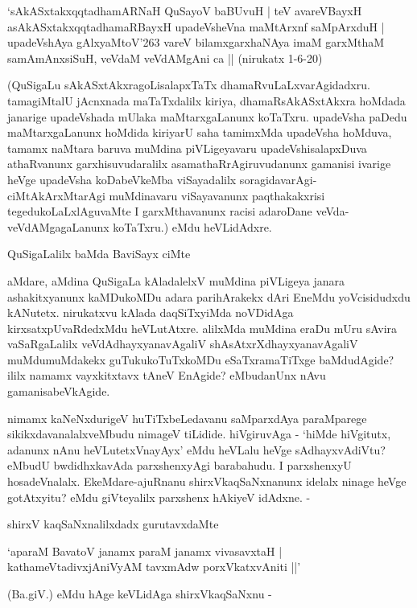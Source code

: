 \begin{shloka}
`sAkASxtakxqqtadhamARNaH QuSayoV baBUvuH | teV avareVBayxH\\
asAkASxtakxqqtadhamaRBayxH upadeVsheVna maMtArxnf saMpArxduH |\\
upadeVshAya gAlxyaMtoV\char'263 vareV bilamxgarxhaNAya imaM garxMthaM\\
samAmAnxsiSuH, veVdaM veVdAMgAni ca || (nirukatx 1-6-20)
\end{shloka}

(QuSigaLu sAkASxtAkxragoLisalapxTaTx dhamaRvuLaLxvarAgidadxru. tamagiMtalU jAcnxnada maTaTxdalilx kiriya, dhamaRsAkASxtAkxra hoMdada janarige upadeVshada mUlaka maMtarxgaLanunx koTaTxru. upadeVsha paDedu maMtarxgaLanunx hoMdida kiriyarU saha tamimxMda upadeVsha hoMduva, tamamx naMtara baruva muMdina piVLigeyavaru upadeVshisalapxDuva athaRvanunx garxhisuvudaralilx asamathaRrAgiruvudanunx gamanisi ivarige heVge upadeVsha koDabeVkeMba viSayadalilx soragidavarAgi-ciMtAkArxMtarAgi muMdinavaru viSayavanunx paqthakakxrisi tegedukoLaLxlAguvaMte I garxMthavanunx racisi adaroDane veVda-veVdAMgagaLanunx koTaTxru.) eMdu heVLidAdxre.

QuSigaLalilx baMda BaviSayx ciMte

aMdare, aMdina QuSigaLa kAladalelxV muMdina piVLigeya janara ashakitxyanunx kaMDukoMDu adara parihArakekx dAri EneMdu yoVcisidudxdu kANutetx. nirukatxvu kAlada daqSiTxyiMda noVDidAga kirxsatxpUvaRdedxMdu heVLutAtxre. alilxMda muMdina eraDu mUru sAvira vaSaRgaLalilx veVdAdhayxyanavAgaliV shAsAtxrXdhayxyanavAgaliV muMdumuMdakekx guTukukoTuTxkoMDu eSaTxramaTiTxge baMdudAgide? ililx namamx vayxkitxtavx tAneV EnAgide? eMbudanUnx nAvu gamanisabeVkAgide.

nimamx kaNeNxdurigeV huTiTxbeLedavanu saMparxdAya paraMparege sikikxdavanalalxveMbudu nimageV tiLidide. hiVgiruvAga - `hiMde hiVgitutx, adanunx nAnu heVLutetxVnayAyx' eMdu heVLalu heVge sAdhayxvAdiVtu? eMbudU bwdidhxkavAda parxshenxyAgi barabahudu. I parxshenxyU hosadeVnalalx. EkeMdare-ajuRnanu shirxVkaqSaNxnanunx idelalx ninage heVge gotAtxyitu? eMdu giVteyalilx parxshenx hAkiyeV idAdxne. -

shirxV kaqSaNxnalilxdadx gurutavxdaMte

\begin{shloka}
`aparaM BavatoV janamx paraM janamx vivasavxtaH |\\
kathameVtadivxjAniVyAM tavxmAdw porxVkatxvAniti ||'
\end{shloka}

(Ba.giV.) eMdu hAge keVLidAga shirxVkaqSaNxnu -

